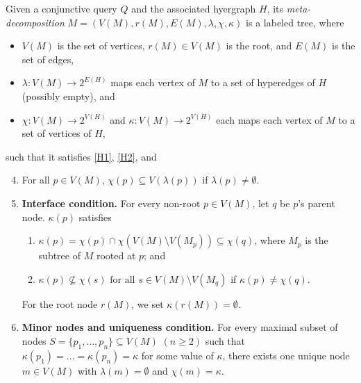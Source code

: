 \begin{definition}
    Given a conjunctive query $Q$ and the associated hyergraph $H$, its \emph{meta-decomposition} $M = (V(M), r(M), E(M), \lambda, \chi, \kappa)$ is a labeled tree, where
    \begin{itemize}[leftmargin=*]
        \item $V(M)$ is the set of vertices, $r(M) \in V(M)$ is the root, and $E(M)$ is the set of edges,
        \item $\lambda : V(M) \rightarrow 2^{E(H)}$ maps each vertex of $M$ to a set of hyperedges of $H$ (possibly empty), and
        \item $\chi : V(M) \rightarrow 2^{V(H)}$ and $\kappa : V(M) \rightarrow 2^{V(H)}$ each maps each vertex of $M$ to a set of vertices of $H$,
    \end{itemize}
    such that it satisfies \ref{H1}, \ref{H2}, and
    \begin{enumerate}[label=(C\textsubscript{\arabic*}),ref=(C\textsubscript{\arabic*}),leftmargin=*]
        \setcounter{enumi}{3}
        \item[{\crtcrossreflabel{(C$_3'$)}[H3']}] For all $p \in V(M)$, $\chi(p) \subseteq V(\lambda(p))$ if $\lambda(p) \neq \emptyset$.
        \item\label{H4}\gdef\Giref{\ref{H4}} \textbf{Interface condition.} For every non-root $p \in V(M)$, let $q$ be $p$'s parent node. $\kappa(p)$ satisfies
        \begin{enumerate}
            \item $\kappa(p) = \chi(p) \cap \chi(V(M) \setminus V(M_p)) \subseteq \chi(q)$, where $M_p$ is the subtree of $M$ rooted at $p$; and
            \item $\kappa(p) \nsubseteq \chi(s) \text{ for all } s \in V(M) \setminus V(M_q)$ if $\kappa(p) \neq \chi(q)$.
        \end{enumerate}
        For the root node $r(M)$, we set $\kappa(r(M)) = \emptyset$.
        
        \item\label{H5}\gdef\Giref{\ref{H5}} \textbf{Minor nodes and uniqueness condition.} For every maximal subset of nodes $S = \{ p_1, \dots, p_n \} \subseteq V(M) $ $(n \geq 2)$ such that $ \kappa(p_1) = \dots = \kappa(p_n) = \kappa $ for some value of $\kappa$, there exists one unique node $ m \in V(M) $ with $ \lambda(m) = \emptyset $ and $ \chi(m) = \kappa$.
    \end{enumerate}
\end{definition}

